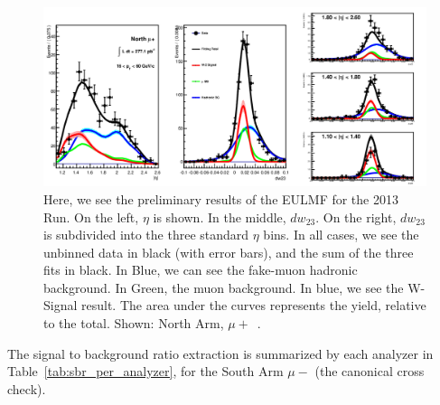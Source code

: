 \begin{figure}
  \centering
  \includegraphics[width=\linewidth]{./figures/prelim_full_maxlikefit_a1q1.jpg}
  \caption{
    Here, we see the preliminary results of the EULMF for the 2013 Run. On the
    left, $\eta$ is shown. In the middle, $dw_{23}$. On the right, $dw_{23}$ is
    subdivided into the three standard $\eta$ bins. In all cases, we see the
    unbinned data in black (with error bars), and the sum of the three fits in
    black. In Blue, we can see the fake-muon hadronic background. In Green, the
    muon background. In blue, we see the W-Signal result. The area under the
    curves represents the yield, relative to the total. Shown: North Arm,
    $\mu+$~\cite{Seidl2014a}.
  }
  \label{fig:maxlikefit_a1q1}
\end{figure}

The signal to background ratio extraction is summarized by each analyzer in
Table~\ref{tab:sbr_per_analyzer}, for the South Arm $\mu-$ (the canonical
cross check).

\begin{table}[h]
  \centering
  \caption{ South arm $W\rightarrow \mu^{-}$ fit results per analyzer
  ~\cite{Seidl2014a}}
  \label{tab:sbr_per_analyzer}
\end{table}
\clearpage

